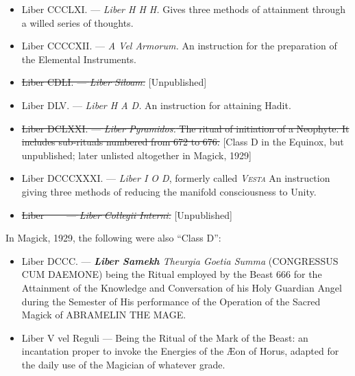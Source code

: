 \begin{itemize}
\item Liber CCCLXI. --- \textit{Liber H H H.} Gives three methods of attainment through a willed series of thoughts.
\item Liber CCCCXII. --- \textit{A Vel Armorum.} An instruction for the preparation of the Elemental Instruments.
\item \sout{Liber CDLI. --- \textit{Liber Siloam.}} [Unpublished]
\item Liber DLV. --- \textit{Liber H A D.} An instruction for attaining Hadit.
\item \sout{Liber DCLXXI. --- \textit{Liber Pyramidos.} The ritual of initiation of a Neophyte. It includes sub-rituals numbered from 672 to 676.} [Class D in the Equinox, but unpublished; later unlisted altogether in Magick, 1929]
\item Liber DCCCXXXI. --- \textit{Liber I O D}, formerly called \textit{\textsc{Vesta}} An instruction giving three methods of reducing the manifold consciousness to Unity.
\item \sout{Liber \-\ \-\ \-\ \-\ --- \textit{Liber Collegii Interni.}} [Unpublished]
\end{itemize}

In Magick, 1929, the following were also \enquote{Class D}:
\begin{itemize}
\item Liber DCCC. --- \textit{\textbf{Liber Samekh} Theurgia Goetia Summa} (CONGRESSUS CUM DAEMONE) being the Ritual employed by the Beast 666 for the Attainment of the Knowledge and Conversation of his Holy Guardian Angel during the Semester of His performance of the Operation of the Sacred Magick of ABRAMELIN THE MAGE.
\item Liber V vel Reguli --- Being the Ritual of the Mark of the Beast: an incantation proper to invoke the Energies of the \AE{}on of Horus, adapted for the daily use of the Magician of whatever grade.
\end{itemize}

